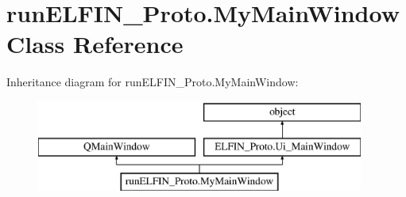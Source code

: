 \hypertarget{classrunELFIN__Proto_1_1MyMainWindow}{\section{run\-E\-L\-F\-I\-N\-\_\-\-Proto.\-My\-Main\-Window Class Reference}
\label{classrunELFIN__Proto_1_1MyMainWindow}
}
Inheritance diagram for run\-E\-L\-F\-I\-N\-\_\-\-Proto.\-My\-Main\-Window\-:\begin{figure}[H]
\begin{center}
\leavevmode
\includegraphics[height=3.000000cm]{classrunELFIN__Proto_1_1MyMainWindow}
\end{center}
\end{figure}
